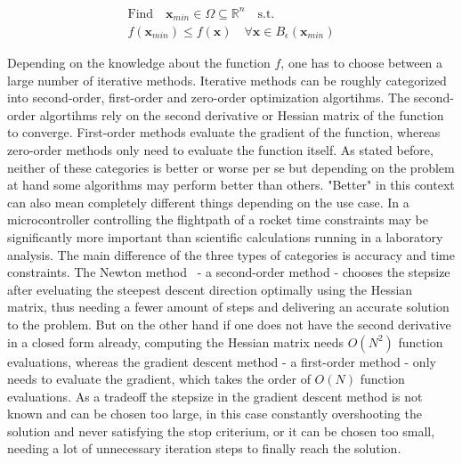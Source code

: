 \documentclass[a4paper,10pt]{article}
\renewcommand{\vec}[1]{\mathbf{#1}}
\begin{document}
    \begin{equation}
        \label{equ:optimization_local}
        \begin{gathered}
        \text{Find} \quad \vec{x}_{min} \in \Omega \subseteq \mathbb{R}^n \quad \text{s.t.}\\
        f(\vec{x}_{min}) \leq f(\vec{x}) \quad \forall \vec{x} \in B_{\epsilon}(\vec{x}_{min})
        \end{gathered} 
    \end{equation}

    Depending on the knowledge about the function $f$, one has to choose
    between a large number of iterative methods.
    Iterative methods can be roughly categorized into second-order, 
    first-order and zero-order optimization algortihms.
    The second-order algortihms rely on the second derivative or
    Hessian matrix of the function to converge.
    First-order methods evaluate the gradient of the function, whereas
    zero-order methods only need to evaluate the function itself.
    As stated before, neither of these categories is better or worse
    per se but depending on the problem at hand some algorithms
    may perform better than others.
    "Better" in this context can also mean completely different things
    depending on the use case.
    In a microcontroller controlling the flightpath of a rocket
    time constraints may be significantly more important than
    scientific calculations running in a laboratory analysis.
    The main difference of the three types of categories is accuracy
    and time constraints.
    The Newton method~\cite{solomon_numerical} - a second-order method -
    chooses the stepsize after eveluating the steepest descent
    direction optimally using the Hessian matrix, thus needing
    a fewer amount of steps and delivering an accurate solution to
    the problem.
    But on the other hand if one does not have the second derivative
    in a closed form already,
    computing the Hessian matrix needs $O(N^2)$
    function evaluations, whereas the gradient descent method
    - a first-order method - only needs to evaluate the gradient, which
    takes the order of $O(N)$ function evaluations.
    As a tradeoff the stepsize in the gradient descent method is not
    known and can be chosen too large, in this case constantly
    overshooting the solution and never satisfying the stop
    criterium, or it can be chosen too small, needing a lot of
    unnecessary iteration steps to finally reach the solution.
    
\end{document}
